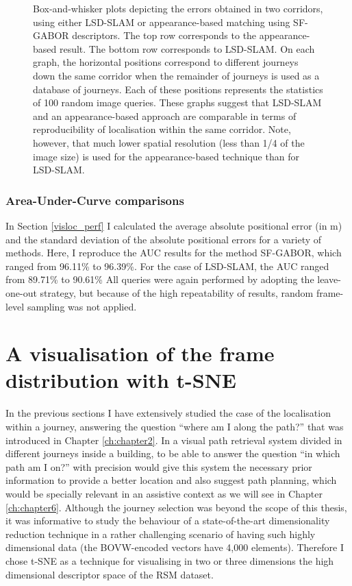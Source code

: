 \begin{figure}
\caption{Box-and-whisker plots depicting the errors obtained in two corridors, using either LSD-SLAM or appearance-based matching using SF-GABOR descriptors. The top row corresponds to the appearance-based result. The bottom row corresponds to LSD-SLAM. On each graph, the horizontal positions correspond to different journeys down the same corridor when the remainder of journeys is used as a database of journeys. Each of these positions represents the statistics of 100 random image queries. These graphs suggest that LSD-SLAM and an appearance-based approach are comparable in terms of reproducibility of localisation within the same corridor. Note, however, that much lower spatial resolution (less than 1/4 of the image size) is used for the appearance-based technique than for LSD-SLAM.}
\label{fig:reprod}
\end{figure}

\subsubsection{Area-Under-Curve comparisons}
In Section \ref{visloc_perf} I calculated the average absolute positional error (in m) and the standard deviation of the absolute positional errors for a variety of methods. Here, I reproduce the AUC results for the method SF-GABOR, which ranged from 96.11\% to 96.39\%. For the case of LSD-SLAM, the AUC ranged from 89.71\% to 90.61\% All queries were again performed by adopting the leave-one-out strategy, but because of the high repeatability of results, random frame-level sampling was not applied.  



\section{A visualisation of the frame distribution with t-SNE}

In the previous sections I have extensively studied the case of the localisation within a journey, answering the question ``where am I along the path?'' that was introduced in Chapter \ref{ch:chapter2}. In a visual path retrieval system divided in different journeys inside a building, to be able to answer the question ``in which path am I on?'' with precision would give this system the necessary prior information to provide a better location and also suggest path planning, which would be specially relevant in an assistive context as we will see in Chapter \ref{ch:chapter6}. Although the journey selection was beyond the scope of this thesis, it was informative to study the behaviour of a state-of-the-art dimensionality reduction technique in a rather challenging scenario of having such highly dimensional data (the BOVW-encoded vectors have 4,000 elements). Therefore I chose t-SNE as a technique for visualising in two or three dimensions the high dimensional descriptor space of the RSM dataset.

